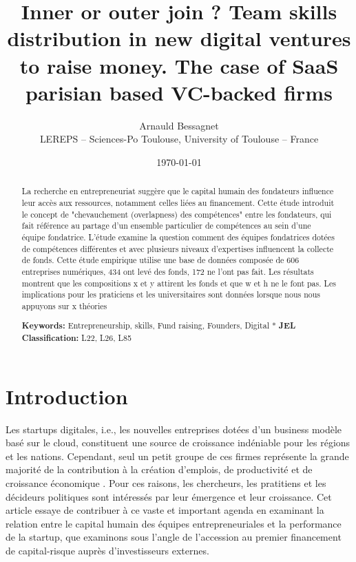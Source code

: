 \documentclass[11pt]{article}
\begin{document}
\title{Inner or outer join ? Team skills distribution in new digital ventures to raise money. The case of SaaS parisian based VC-backed firms}

\author{Arnauld Bessagnet \\ \footnotesize{LEREPS – Sciences-Po Toulouse, University of Toulouse – France} \\}

\date{\today}
\maketitle

\begin{abstract}
\noindent
La recherche en entrepreneuriat suggère que le capital humain des fondateurs influence leur accès aux ressources, notamment celles liées au financement. Cette étude introduit le concept de "chevauchement (overlapness) des compétences" entre les fondateurs, qui fait référence au partage d'un ensemble particulier de compétences au sein d'une équipe fondatrice. L'étude examine la question comment des équipes fondatrices dotées de compétences différentes et avec plusieurs niveaux d'expertises influencent la collecte de fonds. Cette étude empirique utilise une base de données composée de 606 entreprises numériques, 434 ont levé des fonds, 172 ne l'ont pas fait. Les résultats montrent que les compositions x et y attirent les fonds et que w et h ne le font pas. Les implications pour les praticiens et les universitaires sont données lorsque nous nous appuyons sur x théories\newline

\noindent \textbf{Keywords:} Entrepreneurship, skills, Fund raising, Founders, Digital \newline
*
\noindent \textbf{JEL Classification:} L22, L26, L85

\end{abstract}

\clearpage
\section{Introduction}

Les startups digitales, i.e., les nouvelles entreprises dotées d'un business modèle basé sur le cloud, constituent une source de croissance indéniable pour les régions et les nations. Cependant, seul un petit groupe de ces firmes représente la grande majorité de la contribution à la création d'emplois, de productivité et de croissance économique \citep{autio2016entrepreneurship}. Pour ces raisons, les chercheurs, les pratitiens et les décideurs politiques sont intéressés par leur émergence et leur croissance. Cet article essaye de contribuer à ce vaste et important agenda en examinant la relation entre le capital humain des équipes entrepreneuriales et la performance de la startup, que examinons sous l'angle de l'accession au premier financement de capital-risque auprès d'investisseurs externes.
\end{document}
